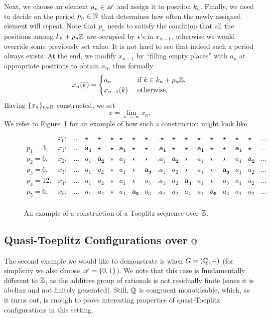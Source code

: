 Next, we choose an element $a_n \in \mathscr{A}$ and assign it to position $k_n$.
%
Finally, we need to decide on the period $p_n \in \mathbb{N}$ that determines how often the newly assigned element will repeat.
% 
Note that $p_n$ needs to satisfy the condition that all the positions among $k_n + p_n \mathbb{Z}$ are occupied by $\star$'s in $x_{n-1}$, otherwise we would override some previously set value.
%
It is not hard to see that indeed such a period always exists. 
%
At the end, we  modify $x_{n-1}$ by ``filling empty places'' with $a_n$ at appropriate positions to obtain $x_n$, thus formally
\[
x_n(k)=\begin{cases}
a_n &\text{ if } k\in k_n+p_n\mathbb{Z},\\
x_{n-1}(k) & \text{ otherwise}.
\end{cases}
\]
Having $\{x_n\}_{n\in\mathbb{N}}$ constructed, we set
\[x=\lim_{n\to\infty}x_n.\]
\noindent We refer to Figure~\ref{fig:toeplitz-z} for an example of how such a construction might look like. %
\begin{figure}
\[
 \begin{array}{ *{18}{l} }
 & x_0\colon &\ldots& \star & \star & \star & \star & \star & \star & .\star & \star & \star &\star & \star & \star & \star & \star&\ldots \\
p_1=3, &x_1\colon&\ldots& \bm{a_1} & \star & \star & \bm{a_1} & \star & \star &.\bm{a_1} & \star & \star & \bm{a_1}  & \star &\star & \bm{a_1} & \star &\ldots \\
%
p_2=6,&x_2\colon &\ldots&a_1 &\bm{a_2} & \star & a_1 & \star & \star & .a_1 &\bm{a_2} & \star &a_1 & \star & \star & a_1 &\bm{a_2}&\ldots \\
%
p_3=6, &x_3\colon &\ldots&a_1 & a_2 & \star & a_1 & \star & \bm{a_3} & .a_1 & a_2 & \star & a_1 & \star & \bm{a_3} &a_1 & a_2&\ldots \\
%
p_4=12, &x_4\colon&\ldots&a_1 & a_2 & \star & a_1 & \star & {a_3} & .a_1 & a_2 & \bm{a_4}& a_1 & \star & {a_3} &a_1 & a_2&\ldots \\
%
p_5=6, &x_5\colon &\ldots&a_1 & a_2 & \star & a_1 & \bm{a_5} & {a_3} & .a_1 & a_2 & {a_4} & a_1 &\bm{a_5} & {a_3} &a_1 & a_2&\ldots \\
 \end{array}
\]
\caption{An example of a construction of a Toeplitz sequence over $\mathbb{Z}$.}\label{fig:toeplitz-z}
\end{figure}

\subsection{Quasi-Toeplitz Configurations over $\mathbb{Q}$}
The second example we would like to demonstrate is when $G=(\mathbb{Q}, +)$ (for simplicity we also choose $\mathscr{A} = \{0,1\}$).  
%
We note that this case is fundamentally different to $\mathbb{Z}$, as the additive group of rationals is not  residually finite (since it is abelian and not finitely generated).
%
Still, $\mathbb{Q}$ is congruent monotileable, which, as it turns out, is enough to prove interesting properties of quasi-Toeplitz configurations in this setting. 


